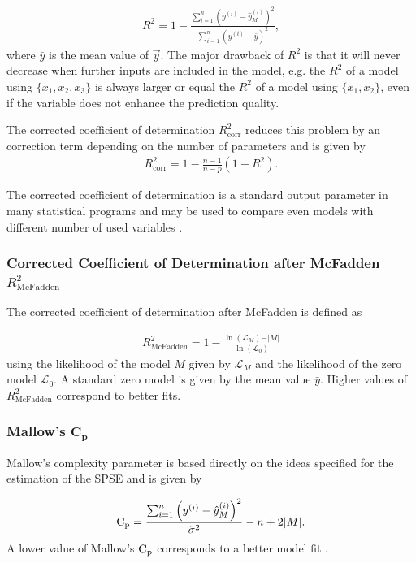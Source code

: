 \begin{align}
	R^2 = 1 - \frac{\sum_{i=1}^n \left( y^{(i)} - \hat y^{(i)}_M \right)^2}{\sum_{i=1}^n \left(y^{(i)} - \bar y\right)^2},
\end{align}
%
where $\bar y$ is the mean value of $\vec{y}$. The major drawback of $R^2$ is that it will never decrease when further inputs are included in the model, e.g. the $R^2$ of a model using $\{x_1, x_2, x_3\}$ is always larger or equal the $R^2$ of a model using $\{x_1, x_2\}$, even if the variable does not enhance the prediction quality. 

The corrected coefficient of determination $R_{\mathrm{corr}}^2$ reduces this problem by an correction term depending on the  number of parameters and is given by
\begin{align}
	R_{\mathrm{corr}}^2 = 1 - \frac{n-1}{n-p}(1-R^2).
\end{align}

The corrected coefficient of determination is a standard output parameter in many statistical programs and may be used to compare even models with different number of used variables \cite{fahrmeir2007regression}.

\subsubsection{Corrected Coefficient of Determination after McFadden $R_{\mathrm{McFadden}}^2$}

The corrected coefficient of determination after McFadden is defined as

\begin{align}
	R_{\mathrm{McFadden}}^2 = 1 - \frac{\ln{(\mathcal{L}_M)} - \vert M \vert }{\ln{(\mathcal{L}_0)}}
\end{align}
%
using the likelihood of the model $M$ given by $\mathcal{L}_M$ and the likelihood of the zero model $\mathcal{L}_0$. A standard zero model is given by the mean value $\bar y$. Higher values of $R_{\mathrm{McFadden}}^2$ correspond to better fits.

\subsubsection{Mallow's $\mathbf{C_p}$}

Mallow's complexity parameter is based directly on the ideas specified for the estimation of the SPSE and is given by

\begin{align}
	\text C_\mathrm{p} = \frac{\sum_{i=1}^n \left(y^{(i)} - \hat y^{(i)}_M\right)^2}{\hat \sigma^2} - n + 2 \vert M \vert.
\end{align}
%
A lower value of Mallow's $\text C_\mathrm{p}$ corresponds to a better model fit \cite{fahrmeir2007regression}.

